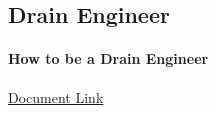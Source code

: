 


\subsection{Drain Engineer}
\paragraph[How to be a Drain Engineer]{How to be a Drain Engineer}
\href{../../documentation/readingRoom/drainResources/HowtoBeaDrainEngineer.pdf}{Document Link}




